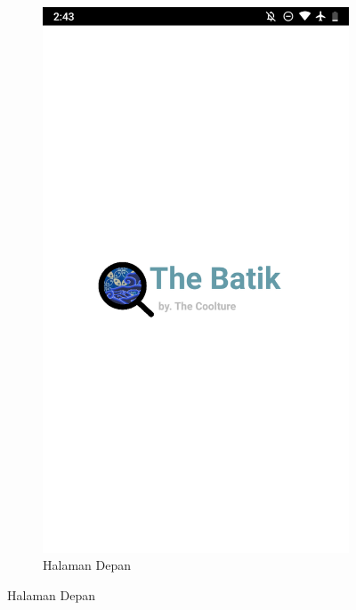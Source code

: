   \begin{figure}[hpt!]

    \centering
    \begin{subfigure}[b]{0.3\textwidth}
      
      \centering
      
      \includegraphics[width=\textwidth]{gambar/satu.png}
      
      \caption{Halaman Depan}
      
      \label{fig:satu}


\end{subfigure}
\end{figure}
